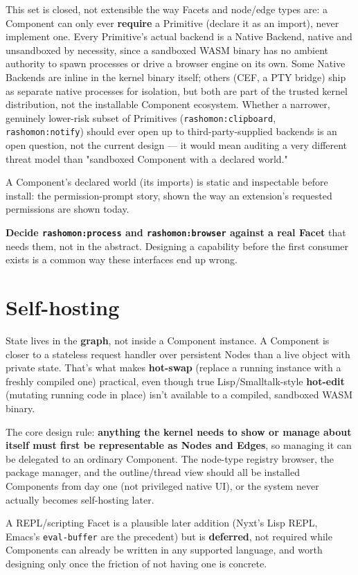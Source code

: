 \documentclass[11pt]{article}
\begin{document}
This set is closed, not extensible the way Facets and node/edge types are: a Component can only ever \textbf{require} a Primitive (declare it as an import), never implement one. Every Primitive's actual backend is a Native Backend, native and unsandboxed by necessity, since a sandboxed WASM binary has no ambient authority to spawn processes or drive a browser engine on its own. Some Native Backends are inline in the kernel binary itself; others (CEF, a PTY bridge) ship as separate native processes for isolation, but both are part of the trusted kernel distribution, not the installable Component ecosystem. Whether a narrower, genuinely lower-risk subset of Primitives (\texttt{rashomon:clipboard}, \texttt{rashomon:notify}) should ever open up to third-party-supplied backends is an open question, not the current design — it would mean auditing a very different threat model than "sandboxed Component with a declared world."

A Component's declared world (its imports) is static and inspectable before install: the permission-prompt story, shown the way an extension's requested permissions are shown today.

\textbf{Decide \texttt{rashomon:process} and \texttt{rashomon:browser} against a real Facet} that needs them, not in the abstract. Designing a capability before the first consumer exists is a common way these interfaces end up wrong.
\section{Self-hosting}
\label{sec:org61cdb90}

State lives in the \textbf{graph}, not inside a Component instance. A Component is closer to a stateless request handler over persistent Nodes than a live object with private state. That's what makes \textbf{hot-swap} (replace a running instance with a freshly compiled one) practical, even though true Lisp/Smalltalk-style \textbf{hot-edit} (mutating running code in place) isn't available to a compiled, sandboxed WASM binary.

The core design rule: \textbf{anything the kernel needs to show or manage about itself must first be representable as Nodes and Edges}, so managing it can be delegated to an ordinary Component. The node-type registry browser, the package manager, and the outline/thread view should all be installed Components from day one (not privileged native UI), or the system never actually becomes self-hosting later.

A REPL/scripting Facet is a plausible later addition (Nyxt's Lisp REPL, Emacs's \texttt{eval-buffer} are the precedent) but is \textbf{deferred}, not required while Components can already be written in any supported language, and worth designing only once the friction of not having one is concrete.
\end{document}
